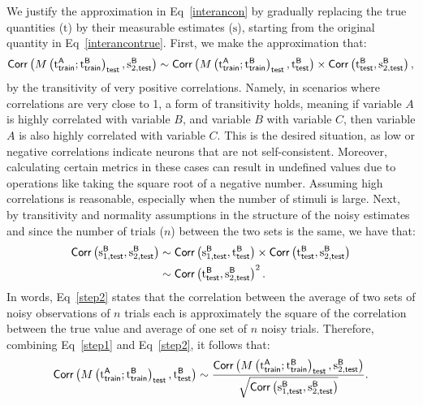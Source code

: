 We justify the approximation in Eq~\eqref{interancon} by gradually replacing the true quantities ($\mathrm{t}$) by their measurable estimates ($\mathrm{s}$), starting from the original quantity in Eq~\eqref{interancontrue}.
First, we make the approximation that:
\begin{equation}\label{step1}
\corr\left(M\left(\trueA;\trueB\right)_{\test}, \ssBtest\right) \sim \corr\left(M\left(\trueA;\trueB\right)_{\test}, \trueBtest\right) \times \corr\left(\trueBtest, \ssBtest\right),
\end{equation}
by the transitivity of very positive correlations. 
Namely, in scenarios where correlations are very close to 1, a form of transitivity holds, meaning if variable $A$ is highly correlated with variable $B$, and variable $B$ with variable $C$, then variable $A$ is also highly correlated with variable $C$. 
This is the desired situation, as low or negative correlations indicate neurons that are not self-consistent.
Moreover, calculating certain metrics in these cases can result in undefined values due to operations like taking the square root of a negative number. 
Assuming high correlations is reasonable, especially when the number of stimuli is large.
Next, by transitivity and normality assumptions in the structure of the noisy estimates and since the number of trials ($n$) between the two sets is the same, we have that:
\begin{align}\label{step2}
\corr\left(\sfBtest, \ssBtest\right) &\sim \corr\left(\sfBtest, \trueBtest\right) \times \corr\left(\trueBtest, \ssBtest\right) \nonumber \\
&\sim \corr\left(\trueBtest, \ssBtest\right)^2.
\end{align}
In words, Eq~\eqref{step2} states that the correlation between the average of two sets of noisy observations of $n$ trials each is approximately the square of the correlation between the true value and average of one set of $n$ noisy trials.
Therefore, combining Eq~\eqref{step1} and Eq~\eqref{step2}, it follows that:
\begin{equation}\label{lemma1}
\corr\left(M\left(\trueA;\trueB\right)_{\test}, \trueBtest\right) \sim \dfrac{\corr\left(M\left(\trueA;\trueB\right)_{\test}, \ssBtest\right)}{\sqrt{\corr\left(\sfBtest, \ssBtest\right)}}.
\end{equation}

